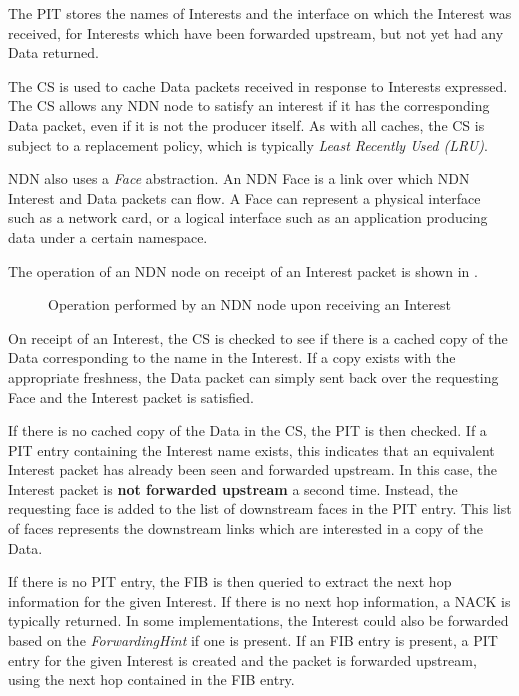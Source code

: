 The PIT stores the names of Interests and the interface on which the Interest was received, for Interests which have been forwarded upstream, but not yet had any Data returned.

The CS is used to cache Data packets received in response to Interests expressed. The CS allows any NDN node to satisfy an interest if it has the corresponding Data packet, even if it is not the producer itself. As with all caches, the CS is subject to a replacement policy, which is typically \textit{Least Recently Used (LRU)}.

NDN also uses a \textit{Face} abstraction. An NDN Face is a link over which NDN Interest and Data packets can flow. A Face can represent a physical interface such as a network card, or a logical interface such as an application producing data under a certain namespace.


The operation of an NDN node on receipt of an Interest packet is shown in .  

\begin{figure}[H]
    \centering
    \caption{Operation performed by an NDN node upon receiving an Interest}
    \label{fig:ndn-on-interest}
\end{figure}

On receipt of an Interest, the CS is checked to see if there is a cached copy of the Data corresponding to the name in the Interest. If a copy exists with the appropriate freshness, the Data packet can simply sent back over the requesting Face and the Interest packet is satisfied. 

If there is no cached copy of the Data in the CS, the PIT is then checked. If a PIT entry containing the Interest name exists, this indicates that an equivalent Interest packet has already been seen and forwarded upstream. In this case, the Interest packet is \textbf{not forwarded upstream} a second time. Instead, the requesting face is added to the list of downstream faces in the PIT entry. This list of faces represents the downstream links which are interested in a copy of the Data.

If there is no PIT entry, the FIB is then queried to extract the next hop information for the given Interest. If there is no next hop information, a NACK is typically returned. In some implementations, the Interest could also be forwarded based on the \textit{ForwardingHint} if one is present. If an FIB entry is present, a PIT entry for the given Interest is created and the packet is forwarded upstream, using the next hop contained in the FIB entry. 

